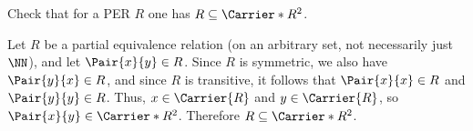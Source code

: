 \begin{exercise}
Check that for a PER \(R\) one has \(R \subseteq \Carrier*{R}^2\).
\end{exercise}

\begin{solution}
Let \(R\) be a partial equivalence relation (on an arbitrary set, not necessarily just \(\NN\)), and let \(\Pair{x}{y} \in R\).
Since \(R\) is symmetric, we also have \(\Pair{y}{x} \in R\), and since \(R\) is transitive, it follows that \(\Pair{x}{x} \in R\) and \(\Pair{y}{y} \in R\).
Thus, \(x \in \Carrier{R}\) and \(y \in \Carrier{R}\), so \(\Pair{x}{y} \in \Carrier*{R}^2\).
Therefore \(R \subseteq \Carrier*{R}^2\).
\end{solution}